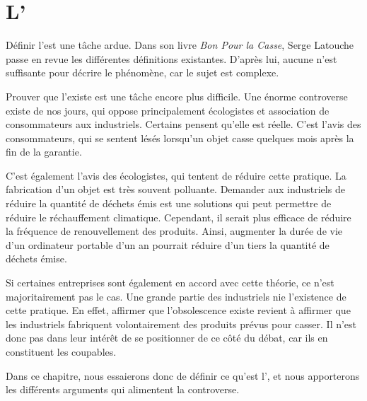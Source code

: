 \chapter{L'\OP}

Définir l'\op est une tâche ardue. Dans son livre \textit{Bon Pour la Casse}, Serge Latouche passe en revue les différentes définitions existantes. D'après lui, aucune n'est suffisante pour décrire le phénomène, car le sujet est complexe.

Prouver que l'\op existe est une tâche encore plus difficile. Une énorme controverse existe de nos jours, qui oppose principalement écologistes et association de consommateurs aux industriels. 
\smallbreak
Certains pensent qu'elle est réelle. C'est l'avis des consommateurs, qui se sentent lésés lorsqu'un objet casse quelques mois après la fin de la garantie.

C'est également  l'avis des écologistes, qui tentent  de réduire cette pratique. La fabrication d'un objet est très souvent polluante. Demander aux industriels de réduire la quantité de déchets émis est une solutions qui peut permettre de réduire le réchauffement climatique. Cependant, il serait plus efficace de réduire la fréquence de renouvellement des produits. Ainsi, augmenter la durée de vie d'un ordinateur portable d'un an pourrait réduire d'un tiers la quantité de déchets émise.  

Si certaines entreprises sont également en accord avec cette théorie, ce n'est majoritairement pas le cas. Une grande partie des industriels nie l'existence de cette pratique. En effet, affirmer que l'obsolescence existe revient à affirmer que les industriels fabriquent volontairement des produits prévus pour casser. Il n'est donc pas dans leur intérêt	de se positionner de ce côté du débat, car ils en constituent les coupables. 

\smallbreak

Dans ce chapitre, nous essaierons donc de définir ce qu'est l'\op, et nous apporterons les différents arguments qui alimentent la controverse. 
